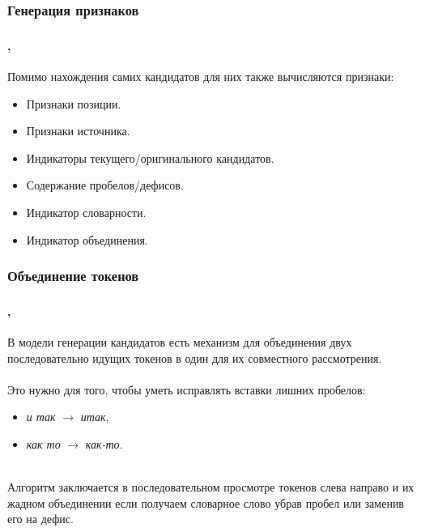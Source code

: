 \documentclass[t, aspectratio=169]{beamer}  %
\begin{document}
\subsubsection{Генерация признаков}
\begin{frame}
	\frametitle{\insertsection} 
	\framesubtitle{\insertsubsection, \insertsubsubsection}
	
	Помимо нахождения самих кандидатов для них также вычисляются признаки:
	\begin{itemize}
		\item Признаки позиции.
		\item Признаки источника.
		\item Индикаторы текущего/оригинального кандидатов.
		\item Содержание пробелов/дефисов.
		\item Индикатор словарности.
		\item Индикатор объединения.
	\end{itemize}
\end{frame}

\subsubsection{Объединение токенов}
\begin{frame}
	\frametitle{\insertsection} 
	\framesubtitle{\insertsubsection, \insertsubsubsection}
	В модели генерации кандидатов есть механизм для объединения двух последовательно идущих токенов в один для их совместного рассмотрения. \\~\\
	
	Это нужно для того, чтобы уметь исправлять вставки лишних пробелов: 
	\begin{itemize}
		\item \textit{и так} $\rightarrow$ \textit{итак}, 
		\item \textit{как то} $\rightarrow$ \textit{как-то}. \\~\\
	\end{itemize}
	Алгоритм заключается в последовательном просмотре токенов слева направо и их жадном объединении если получаем словарное слово убрав пробел или заменив его на дефис.
	
\end{frame}
\end{document}

